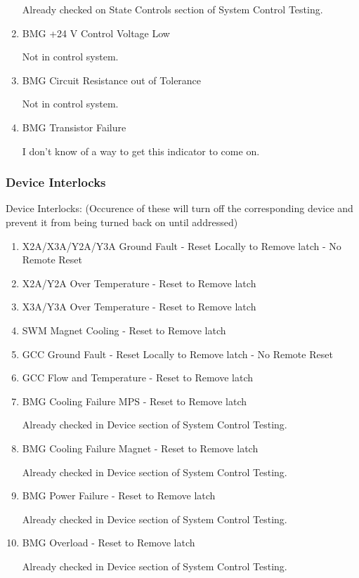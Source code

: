 \documentclass[11pt]{book}		%
\begin{document}
\begin{enumerate}
\color{red}
Already checked on State Controls section of System Control Testing.
\color{black}

 \item BMG +24 V Control Voltage Low

\color{red}
Not in control system.
\color{black}

 \item BMG Circuit Resistance out of Tolerance

\color{red}
Not in control system.
\color{black}

\item BMG Transistor Failure

\color{red}
I don't know of a way to get this indicator to come on.
\color{black}

\end{enumerate}

\subsubsection{Device Interlocks}

Device Interlocks:
(Occurence of these will turn off the corresponding device and prevent it from being turned back on until addressed)

\begin{enumerate}
 \item X2A/X3A/Y2A/Y3A Ground Fault - Reset Locally to Remove latch - No Remote Reset
 \item X2A/Y2A Over Temperature - Reset to Remove latch
 \item X3A/Y3A Over Temperature - Reset to Remove latch
 \item SWM Magnet Cooling - Reset to Remove latch
 \item GCC Ground Fault - Reset Locally to Remove latch - No Remote Reset
 \item GCC Flow and Temperature - Reset to Remove latch
 \item BMG Cooling Failure MPS - Reset to Remove latch

\color{red}
Already checked in Device section of System Control Testing.
\color{black}

 \item BMG Cooling Failure Magnet - Reset to Remove latch

\color{red}
Already checked in Device section of System Control Testing.
\color{black}

 \item BMG Power Failure - Reset to Remove latch

\color{red}
Already checked in Device section of System Control Testing.
\color{black}

 \item BMG Overload - Reset to Remove latch

\color{red}
Already checked in Device section of System Control Testing.
\color{black}

\end{enumerate}
\end{document}
